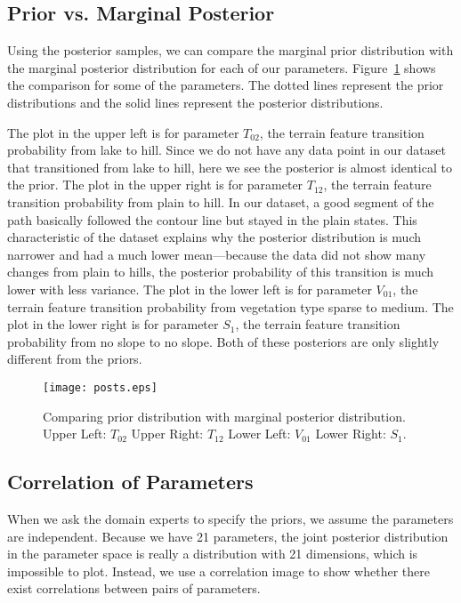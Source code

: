 \documentclass[smallextended,natbib]{svjour3}
\begin{document}
\subsection{Prior vs. Marginal Posterior}
\label{sec:4.2}

Using the posterior samples, we can compare the marginal prior distribution with the marginal posterior distribution for each of our parameters. Figure~\ref{posts} shows the comparison for some of the parameters. The dotted lines represent the prior distributions and the solid lines represent the posterior distributions.

The plot in the upper left is for parameter $T_{02}$, the terrain feature transition probability from lake to hill. Since we do not have any data point in our dataset that transitioned from lake to hill, here we see the posterior is almost identical to the prior. The plot in the upper right is for parameter $T_{12}$, the terrain feature transition probability from plain to hill. In our dataset, a good segment of the path basically followed the contour line but stayed in the plain states. This characteristic of the dataset explains why the posterior distribution is much narrower and had a much lower mean---because the data did not show many changes from plain to hills, the posterior probability of this transition is much lower with less variance. The plot in the lower left is for parameter $V_{01}$, the terrain feature transition probability from vegetation type sparse to medium. The plot in the lower right is for parameter $S_1$, the terrain feature transition probability from no slope to no slope. Both of these posteriors are only slightly different from the priors.
\begin{figure}
\centering
\texttt{[image: posts.eps]}
\caption[Comparing prior distribution with marginal posterior distribution]{Comparing prior distribution with marginal posterior distribution. Upper Left: $T_{02}$ Upper Right: $T_{12}$ Lower Left: $V_{01}$ Lower Right: $S_1$.}
\label{posts}
\end{figure}

\subsection{Correlation of Parameters}
\label{sec:4.3}

When we ask the domain experts to specify the priors, we assume the parameters are independent. Because we have 21 parameters, the joint posterior distribution in the parameter space is really a distribution with 21 dimensions, which is impossible to plot. Instead, we use a correlation image to show whether there exist correlations between pairs of parameters.
\end{document}
